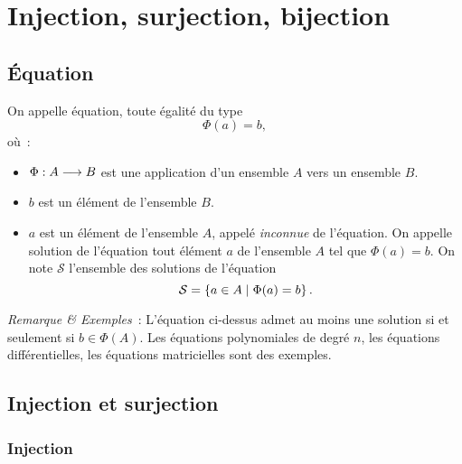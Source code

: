 \section{Injection, surjection, bijection}
\label{chap3-sec:injsurbij}

\subsection{Équation}
\label{chap3-subsec:equation}

\begin{defdef}
    On appelle équation, toute égalité du type
    \begin{equation}
        \Phi(a)=b,
    \end{equation}
    où~:
    \begin{itemize}
        \item \(\Phi:A \longrightarrow B\) est une application d'un ensemble \(A\) 
            vers un ensemble \(B\).
        \item \(b\) est un élément de l'ensemble \(B\).
        \item \(a\) est un élément de l'ensemble \(A\), appelé \emph{inconnue} de 
            l'équation. On appelle solution de l'équation tout élément \(a\) de 
            l'ensemble \(A\) tel que \(\Phi(a)=b\). On note \(\mathcal{S}\) 
            l'ensemble des solutions de l'équation
            \begin{equation}
                \mathcal{S} = \left\{a \in A\mathrel{}\middle|\mathrel{}\Phi(a)=b\right\}.
            \end{equation}
    \end{itemize}
\end{defdef}
\emph{Remarque \& Exemples}~: L'équation ci-dessus admet au moins une solution 
si et seulement si \(b \in \Phi(A)\). Les équations polynomiales de degré \(n\), 
les équations différentielles, les équations matricielles sont des exemples.

\subsection{Injection et surjection}
\label{chap3-subsec:injetsurj}

\subsubsection{Injection}
\label{chap3-subsubsec:injection}

